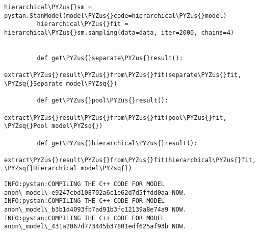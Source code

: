 \documentclass[11pt]{article}
\def\PYZsq{\textquotesingle}%
\def\PYZus{\char`\_}
\def\PYZsq{\char`\'}
\begin{document}
\begin{Verbatim}[commandchars=\\\{\}]
         hierarchical\PYZus{}sm = pystan.StanModel(model\PYZus{}code=hierarchical\PYZus{}model)
         hierarchical\PYZus{}fit = hierarchical\PYZus{}sm.sampling(data=data, iter=2000, chains=4)
         
         
         def get\PYZus{}separate\PYZus{}result():
             extract\PYZus{}result\PYZus{}from\PYZus{}fit(separate\PYZus{}fit, \PYZsq{}Separate model\PYZsq{})    
             
         def get\PYZus{}pool\PYZus{}result():
             extract\PYZus{}result\PYZus{}from\PYZus{}fit(pool\PYZus{}fit, \PYZsq{}Pool model\PYZsq{})    
             
         def get\PYZus{}hierarchical\PYZus{}result():
             extract\PYZus{}result\PYZus{}from\PYZus{}fit(hierarchical\PYZus{}fit, \PYZsq{}Hierarchical model\PYZsq{})
\end{Verbatim}


    \begin{Verbatim}[commandchars=\\\{\}]
INFO:pystan:COMPILING THE C++ CODE FOR MODEL anon\_model\_e9247cbd108702a6c1e62d7d5ffdd0aa NOW.
INFO:pystan:COMPILING THE C++ CODE FOR MODEL anon\_model\_b3b1d4093fb7ad91b3fc12139a8e74a9 NOW.
INFO:pystan:COMPILING THE C++ CODE FOR MODEL anon\_model\_431a2067d773445b37801edf625af93b NOW.

    \end{Verbatim}


    
    
    
    
\end{document}

